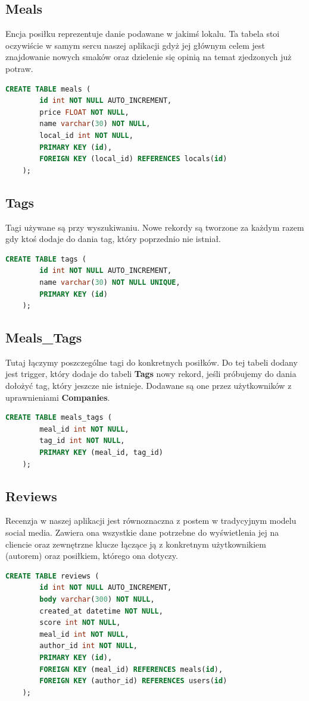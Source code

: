 \documentclass{report}
\begin{document}
\subsection*{Meals}
Encja posiłku reprezentuje danie podawane w jakimś lokalu.
Ta tabela stoi oczywiście w samym sercu naszej aplikacji gdyż
jej głównym celem jest znajdowanie nowych smaków oraz dzielenie
się opinią na temat zjedzonych już potraw.
\begin{lstlisting}[language=SQL]
    CREATE TABLE meals (
        id int NOT NULL AUTO_INCREMENT,
        price FLOAT NOT NULL,
        name varchar(30) NOT NULL, 
        local_id int NOT NULL,
        PRIMARY KEY (id),
        FOREIGN KEY (local_id) REFERENCES locals(id)
    );
\end{lstlisting}

\subsection*{Tags}
Tagi używane są przy wyszukiwaniu. Nowe rekordy są tworzone
za każdym razem gdy ktoś dodaje do dania tag, który poprzednio
nie istniał.
\begin{lstlisting}[language=SQL]
    CREATE TABLE tags (
        id int NOT NULL AUTO_INCREMENT, 
        name varchar(30) NOT NULL UNIQUE,
        PRIMARY KEY (id)
    );
\end{lstlisting}

\subsection*{Meals\_Tags}
Tutaj łączymy poszczególne tagi do konkretnych posiłków.
Do tej tabeli dodany jest trigger, który dodaje do tabeli \textbf{Tags}
nowy rekord, jeśli próbujemy do dania dołożyć tag, który jeszcze nie istnieje.
Dodawane są one przez użytkowników z uprawnieniami \textbf{Companies}.
\begin{lstlisting}[language=SQL]
    CREATE TABLE meals_tags ( 
        meal_id int NOT NULL,
        tag_id int NOT NULL,
        PRIMARY KEY (meal_id, tag_id)
    );
\end{lstlisting}

\subsection*{Reviews}
Recenzja w naszej aplikacji jest równoznaczna z postem w tradycyjnym
modelu social media. Zawiera ona wszystkie dane potrzebne do
wyświetlenia jej na cliencie oraz zewnętrzne klucze łączące ją
z konkretnym użytkownikiem (autorem) oraz posiłkiem, którego ona dotyczy.
\begin{lstlisting}[language=SQL]
    CREATE TABLE reviews (
        id int NOT NULL AUTO_INCREMENT,
        body varchar(300) NOT NULL, 
        created_at datetime NOT NULL, 
        score int NOT NULL, 
        meal_id int NOT NULL, 
        author_id int NOT NULL,
        PRIMARY KEY (id),
        FOREIGN KEY (meal_id) REFERENCES meals(id),
        FOREIGN KEY (author_id) REFERENCES users(id)
    );
\end{lstlisting}
\end{document}

